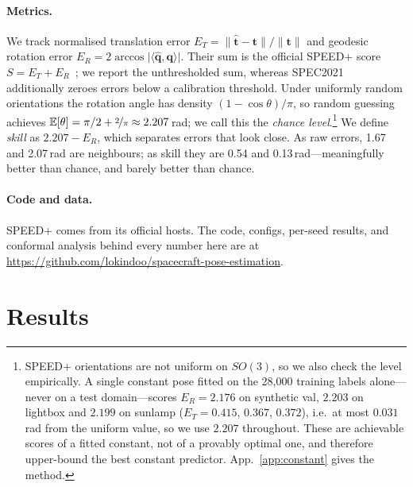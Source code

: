 \documentclass{article}
\newcommand{\Erot}{E_{R}}
\newcommand{\Etrans}{E_{T}}
\begin{document}
\paragraph{Metrics.} We track normalised translation error $\Etrans =
\lVert\hat{\mathbf{t}}-\mathbf{t}\rVert / \lVert\mathbf{t}\rVert$ and geodesic
rotation error $\Erot = 2\arccos\lvert\langle\hat{\mathbf{q}},
\mathbf{q}\rangle\rvert$. Their sum is the official SPEED+ score
$S = \Etrans + \Erot$~\citep{kisantal2020speed}; we report the unthresholded sum,
whereas SPEC2021~\citep{park2023spec2021} additionally zeroes errors below a calibration threshold. Under
uniformly random orientations the rotation angle has density $(1-\cos\theta)/\pi$,
so random guessing achieves $\mathbb{E}[\theta] = \pi/2 + \nicefrac{2}{\pi} \approx
2.207$\,rad; we call this the \emph{chance level}.\footnote{SPEED+ orientations are
not uniform on $SO(3)$, so we also check the level empirically. A single constant
pose fitted on the 28{,}000 training labels alone---never on a test domain---scores
$\Erot = 2.176$ on synthetic val, $2.203$ on lightbox and $2.199$ on sunlamp
($\Etrans = 0.415$, $0.367$, $0.372$), i.e.\ at most $0.031$\,rad from the uniform value,
so we use $2.207$ throughout. These are achievable scores of a fitted constant, not
of a provably optimal one, and therefore upper-bound the best constant predictor.
App.~\ref{app:constant} gives the method.} We define \emph{skill} as $2.207 - \Erot$,
which separates errors that look close. As raw errors, 1.67 and 2.07\,rad are neighbours;
as skill they are 0.54 and 0.13\,rad---meaningfully better than chance, and barely better
than chance.

\paragraph{Code and data.} SPEED+ comes from its official hosts. The code, configs,
per-seed results, and conformal analysis behind every number here are at
\url{https://github.com/lokindoo/spacecraft-pose-estimation}.

\section{Results}
\label{sec:results}
\end{document}
